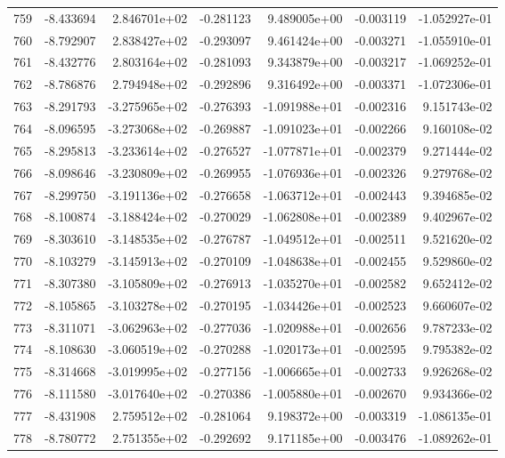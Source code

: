 \begin{tabular}{rrrrrrr}
 759 &  -8.433694 &  2.846701e+02 & -0.281123 &  9.489005e+00 &   -0.003119 & -1.052927e-01 \\
 760 &  -8.792907 &  2.838427e+02 & -0.293097 &  9.461424e+00 &   -0.003271 & -1.055910e-01 \\
 761 &  -8.432776 &  2.803164e+02 & -0.281093 &  9.343879e+00 &   -0.003217 & -1.069252e-01 \\
 762 &  -8.786876 &  2.794948e+02 & -0.292896 &  9.316492e+00 &   -0.003371 & -1.072306e-01 \\
 763 &  -8.291793 & -3.275965e+02 & -0.276393 & -1.091988e+01 &   -0.002316 &  9.151743e-02 \\
 764 &  -8.096595 & -3.273068e+02 & -0.269887 & -1.091023e+01 &   -0.002266 &  9.160108e-02 \\
 765 &  -8.295813 & -3.233614e+02 & -0.276527 & -1.077871e+01 &   -0.002379 &  9.271444e-02 \\
 766 &  -8.098646 & -3.230809e+02 & -0.269955 & -1.076936e+01 &   -0.002326 &  9.279768e-02 \\
 767 &  -8.299750 & -3.191136e+02 & -0.276658 & -1.063712e+01 &   -0.002443 &  9.394685e-02 \\
 768 &  -8.100874 & -3.188424e+02 & -0.270029 & -1.062808e+01 &   -0.002389 &  9.402967e-02 \\
 769 &  -8.303610 & -3.148535e+02 & -0.276787 & -1.049512e+01 &   -0.002511 &  9.521620e-02 \\
 770 &  -8.103279 & -3.145913e+02 & -0.270109 & -1.048638e+01 &   -0.002455 &  9.529860e-02 \\
 771 &  -8.307380 & -3.105809e+02 & -0.276913 & -1.035270e+01 &   -0.002582 &  9.652412e-02 \\
 772 &  -8.105865 & -3.103278e+02 & -0.270195 & -1.034426e+01 &   -0.002523 &  9.660607e-02 \\
 773 &  -8.311071 & -3.062963e+02 & -0.277036 & -1.020988e+01 &   -0.002656 &  9.787233e-02 \\
 774 &  -8.108630 & -3.060519e+02 & -0.270288 & -1.020173e+01 &   -0.002595 &  9.795382e-02 \\
 775 &  -8.314668 & -3.019995e+02 & -0.277156 & -1.006665e+01 &   -0.002733 &  9.926268e-02 \\
 776 &  -8.111580 & -3.017640e+02 & -0.270386 & -1.005880e+01 &   -0.002670 &  9.934366e-02 \\
 777 &  -8.431908 &  2.759512e+02 & -0.281064 &  9.198372e+00 &   -0.003319 & -1.086135e-01 \\
 778 &  -8.780772 &  2.751355e+02 & -0.292692 &  9.171185e+00 &   -0.003476 & -1.089262e-01 \\

\end{tabular}
